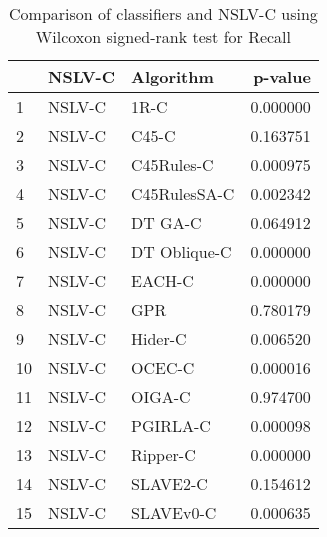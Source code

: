 \begin{table}
\footnotesize
\caption{Comparison of classifiers and NSLV-C using Wilcoxon signed-rank test for Recall}
\label{tab:NSLV-C wilcoxon Recall comparison}
\begin{tabular}{lllr}
\hline
 & NSLV-C & Algorithm & p-value \\
\hline
1 & NSLV-C & 1R-C & 0.000000 \\
2 & NSLV-C & C45-C & 0.163751 \\
3 & NSLV-C & C45Rules-C & 0.000975 \\
4 & NSLV-C & C45RulesSA-C & 0.002342 \\
5 & NSLV-C & DT GA-C & 0.064912 \\
6 & NSLV-C & DT Oblique-C & 0.000000 \\
7 & NSLV-C & EACH-C & 0.000000 \\
8 & NSLV-C & GPR & 0.780179 \\
9 & NSLV-C & Hider-C & 0.006520 \\
10 & NSLV-C & OCEC-C & 0.000016 \\
11 & NSLV-C & OIGA-C & 0.974700 \\
12 & NSLV-C & PGIRLA-C & 0.000098 \\
13 & NSLV-C & Ripper-C & 0.000000 \\
14 & NSLV-C & SLAVE2-C & 0.154612 \\
15 & NSLV-C & SLAVEv0-C & 0.000635 \\
\hline
\end{tabular}
\end{table}
